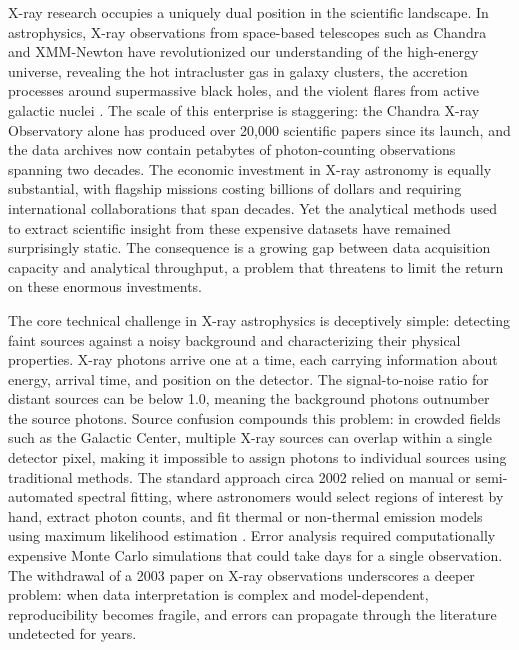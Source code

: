 \documentclass[conference]{IEEEtran}
\begin{document}
X-ray research occupies a uniquely dual position in the scientific landscape. In astrophysics, X-ray observations from space-based telescopes such as Chandra and XMM-Newton have revolutionized our understanding of the high-energy universe, revealing the hot intracluster gas in galaxy clusters, the accretion processes around supermassive black holes, and the violent flares from active galactic nuclei \cite{r1}. The scale of this enterprise is staggering: the Chandra X-ray Observatory alone has produced over 20,000 scientific papers since its launch, and the data archives now contain petabytes of photon-counting observations spanning two decades. The economic investment in X-ray astronomy is equally substantial, with flagship missions costing billions of dollars and requiring international collaborations that span decades. Yet the analytical methods used to extract scientific insight from these expensive datasets have remained surprisingly static. The consequence is a growing gap between data acquisition capacity and analytical throughput, a problem that threatens to limit the return on these enormous investments.

The core technical challenge in X-ray astrophysics is deceptively simple: detecting faint sources against a noisy background and characterizing their physical properties. X-ray photons arrive one at a time, each carrying information about energy, arrival time, and position on the detector. The signal-to-noise ratio for distant sources can be below 1.0, meaning the background photons outnumber the source photons. Source confusion compounds this problem: in crowded fields such as the Galactic Center, multiple X-ray sources can overlap within a single detector pixel, making it impossible to assign photons to individual sources using traditional methods. The standard approach circa 2002 relied on manual or semi-automated spectral fitting, where astronomers would select regions of interest by hand, extract photon counts, and fit thermal or non-thermal emission models using maximum likelihood estimation \cite{r1}. Error analysis required computationally expensive Monte Carlo simulations that could take days for a single observation. The withdrawal of a 2003 paper on X-ray observations \cite{r2} underscores a deeper problem: when data interpretation is complex and model-dependent, reproducibility becomes fragile, and errors can propagate through the literature undetected for years.
\end{document}
